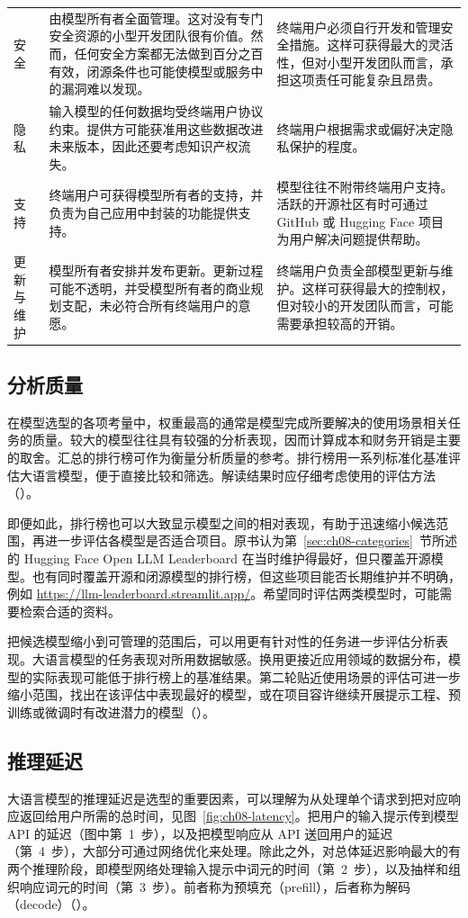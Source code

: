 {\begin{longtable}{@{}>{\raggedright\arraybackslash}p{15mm} >{\raggedright\arraybackslash}p{47mm} >{\raggedright\arraybackslash}p{47mm}@{}}
安全 & 由模型所有者全面管理。这对没有专门安全资源的小型开发团队很有价值。然而，任何安全方案都无法做到百分之百有效，闭源条件也可能使模型或服务中的漏洞难以发现。 & 终端用户必须自行开发和管理安全措施。这样可获得最大的灵活性，但对小型开发团队而言，承担这项责任可能复杂且昂贵。\\
隐私 & 输入模型的任何数据均受终端用户协议约束。提供方可能获准用这些数据改进未来版本，因此还要考虑知识产权流失。 & 终端用户根据需求或偏好决定隐私保护的程度。\\
支持 & 终端用户可获得模型所有者的支持，并负责为自己应用中封装的功能提供支持。 & 模型往往不附带终端用户支持。活跃的开源社区有时可通过 GitHub 或 Hugging Face 项目为用户解决问题提供帮助。\\
更新与维护 & 模型所有者安排并发布更新。更新过程可能不透明，并受模型所有者的商业规划支配，未必符合所有终端用户的意愿。 & 终端用户负责全部模型更新与维护。这样可获得最大的控制权，但对较小的开发团队而言，可能需要承担较高的开销。\\
\end{longtable}
}

\subsection{分析质量}
在模型选型的各项考量中，权重最高的通常是模型完成所要解决的使用场景相关任务的质量。较大的模型往往具有较强的分析表现，因而计算成本和财务开销是主要的取舍。汇总的排行榜可作为衡量分析质量的参考。排行榜用一系列标准化基准评估大语言模型，便于直接比较和筛选。解读结果时应仔细考虑使用的评估方法（）。

即便如此，排行榜也可以大致显示模型之间的相对表现，有助于迅速缩小候选范围，再进一步评估各模型是否适合项目。原书认为第~\ref{sec:ch08-categories}~节所述的 Hugging Face Open LLM Leaderboard 在当时维护得最好，但只覆盖开源模型。也有同时覆盖开源和闭源模型的排行榜，但这些项目能否长期维护并不明确，例如 \url{https://llm-leaderboard.streamlit.app/}。希望同时评估两类模型时，可能需要检索合适的资料。

把候选模型缩小到可管理的范围后，可以用更有针对性的任务进一步评估分析表现。大语言模型的任务表现对所用数据敏感。换用更接近应用领域的数据分布，模型的实际表现可能低于排行榜上的基准结果。第二轮贴近使用场景的评估可进一步缩小范围，找出在该评估中表现最好的模型，或在项目容许继续开展提示工程、预训练或微调时有改进潜力的模型（）。

\subsection{推理延迟}
\label{sec:ch08-latency}
大语言模型的推理延迟是选型的重要因素，可以理解为从处理单个请求到把对应响应返回给用户所需的总时间，见图~\ref{fig:ch08-latency}。把用户的输入提示传到模型 API 的延迟（图中第~1~步），以及把模型响应从 API 送回用户的延迟（第~4~步），大部分可通过网络优化来处理。除此之外，对总体延迟影响最大的有两个推理阶段，即模型网络处理输入提示中词元的时间（第~2~步），以及抽样和组织响应词元的时间（第~3~步）。前者称为预填充（prefill），后者称为解码（decode）（）。

